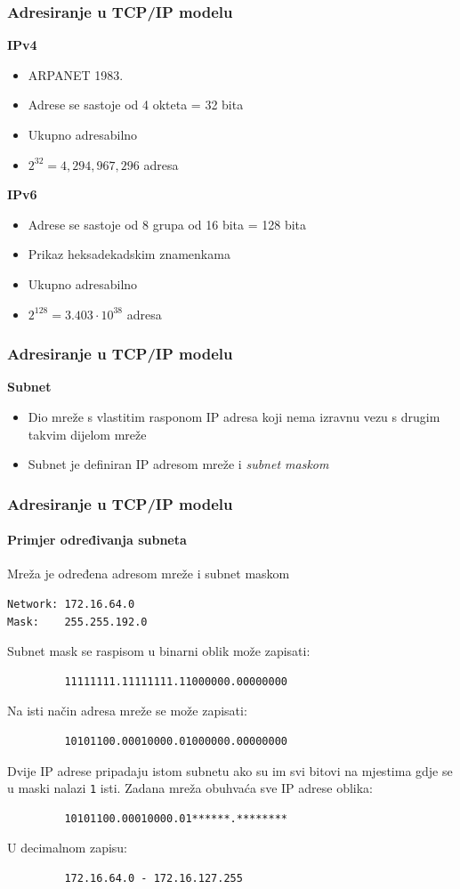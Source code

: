 \documentclass[t,table,usenames,dvipsnames]{beamer}
\begin{document}
\begin{frame}
	\frametitle{Adresiranje u TCP/IP modelu}
	\textbf{IPv4}
	\begin{itemize}
		\item ARPANET 1983.
		\item Adrese se sastoje od 4 okteta = 32 bita
		\item Ukupno adresabilno
		\item[] $2^{32} = 4,294,967,296$ adresa
	\end{itemize}
	\vfill
	\textbf{IPv6}
	\begin{itemize}
		\item Adrese se sastoje od 8 grupa od 16 bita = 128 bita
		\item Prikaz heksadekadskim znamenkama
		\item Ukupno adresabilno
		\item[] $2^{128} = 3.403 \cdot 10^{38}$ adresa
	\end{itemize}
\end{frame}


\begin{frame}
	\frametitle{Adresiranje u TCP/IP modelu}
	\textbf{Subnet}
	\begin{itemize}
		\item Dio mreže s vlastitim rasponom IP adresa koji nema izravnu vezu s drugim takvim dijelom mreže
		\item Subnet je definiran IP adresom mreže i \textit{subnet maskom}
	\end{itemize}
\end{frame}

\begin{frame}[fragile]
	\frametitle{Adresiranje u TCP/IP modelu}
	\framesubtitle{Primjer određivanja subneta}
	\footnotesize
	Mreža je određena adresom mreže i subnet maskom
	\begin{verbatim}
Network: 172.16.64.0
Mask:    255.255.192.0
	\end{verbatim}
	Subnet mask se raspisom u binarni oblik može zapisati:
	\begin{verbatim}
         11111111.11111111.11000000.00000000
	\end{verbatim}
	Na isti način adresa mreže se može zapisati:
	\begin{verbatim}
         10101100.00010000.01000000.00000000
	\end{verbatim}
	Dvije IP adrese pripadaju istom subnetu ako su im svi bitovi na mjestima gdje se u maski nalazi \texttt{1} isti. Zadana mreža obuhvaća sve IP adrese oblika:
	\begin{verbatim}
         10101100.00010000.01******.********
	\end{verbatim}
	U decimalnom zapisu:
	\begin{verbatim}
         172.16.64.0 - 172.16.127.255
	\end{verbatim}
\end{frame}
\end{document}
